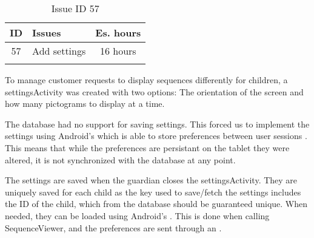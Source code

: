 \begin{longtable} { | c | p{12cm} | c | } 
\hline
	ID 	&	Issues	&		 Es. hours \\\hline
	57	&	Add settings	&	16 hours	\\\hline
\caption{Issue ID 57}
\label{tab:spr4_addsettings}
\end{longtable}

To manage customer requests to display sequences differently for children, a settingsActivity was created with two options: The orientation of the screen and how many pictograms to display at a time.

The database had no support for saving settings. This forced us to implement the settings using Android's  which is able to store preferences between user sessions \cite{sharedpreferences}. This means that while the preferences are persistant on the tablet they were altered, it is not synchronized with the database at any point.

The settings are saved when the guardian closes the settingsActivity. They are uniquely saved for each child as the key used to save/fetch the settings includes the ID of the child, which from the database should be guaranteed unique. When needed, they can be loaded using Android's . This is done when calling SequenceViewer, and the preferences are sent through an .